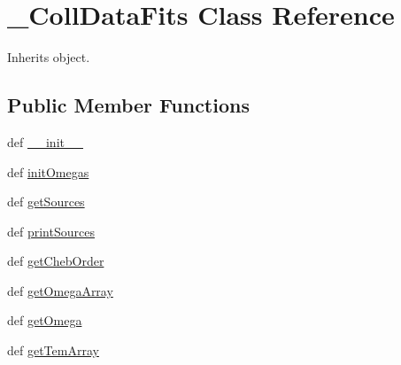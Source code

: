 \hypertarget{classpyneb_1_1core_1_1pynebcore_1_1___coll_data_fits}{\section{\-\_\-\-Coll\-Data\-Fits Class Reference}
\label{classpyneb_1_1core_1_1pynebcore_1_1___coll_data_fits}
}


Inherits object.

\subsection*{Public Member Functions}
\begin{DoxyCompactItemize}
\item 
def \hyperlink{classpyneb_1_1core_1_1pynebcore_1_1___coll_data_fits_ac775ee34451fdfa742b318538164070e}{\-\_\-\-\_\-init\-\_\-\-\_\-}
\item 
def \hyperlink{classpyneb_1_1core_1_1pynebcore_1_1___coll_data_fits_a012776cf472bdbae48b49c62d738cc85}{init\-Omegas}
\item 
def \hyperlink{classpyneb_1_1core_1_1pynebcore_1_1___coll_data_fits_a13685d48c0180c5463a5dffebcd4fb29}{get\-Sources}
\item 
def \hyperlink{classpyneb_1_1core_1_1pynebcore_1_1___coll_data_fits_a0120b7dbd5f911f8b1df2d2cebf6c09c}{print\-Sources}
\item 
def \hyperlink{classpyneb_1_1core_1_1pynebcore_1_1___coll_data_fits_a949347115a864eb62f2db4ad33406b4b}{get\-Cheb\-Order}
\item 
def \hyperlink{classpyneb_1_1core_1_1pynebcore_1_1___coll_data_fits_abe866c7263d184180cefd99da4439667}{get\-Omega\-Array}
\item 
def \hyperlink{classpyneb_1_1core_1_1pynebcore_1_1___coll_data_fits_aaf6e92dda1e6d1aa7d06098b4e9a4e6d}{get\-Omega}
\item 
def \hyperlink{classpyneb_1_1core_1_1pynebcore_1_1___coll_data_fits_a903ccea78642f5853c9a01b1616c6899}{get\-Tem\-Array}
\end{DoxyCompactItemize}
